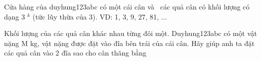 Cửa hàng của duyhung123abc có một cái cân và  các quả cân có khối lượng có dạng 3   $^    k   $   (tức lũy thừa của 3). VD: 1, 3, 9, 27, 81, ...  

   Khối lượng của các quả cân khác nhau từng đôi một. Duyhung123abc có một vật nặng M kg, vật nặng được đặt vào đĩa bên trái của cái cân. Hãy giúp anh ta đặt các quả cân vào 2 đĩa sao cho cân thãng bằng  

\
